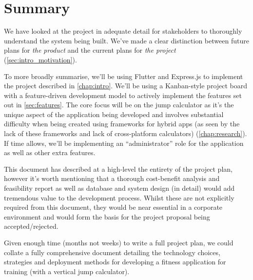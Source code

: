 \chapter{Summary}
We have looked at the project in adequate detail for stakeholders
to thoroughly understand the system being built. We've made a clear distinction between
future plans for \textit{the product} and the current plans for \textit{the project} (\cref{sec:intro_motivation}).
\par
To more broadly summarise, we'll be using Flutter and Express.js to 
implement the project described in \cref{chap:intro}. We'll
be using a Kanban-style project board with a feature-driven development model
to actively implement the features set out in \cref{sec:features}. The core focus
will be on the jump calculator as it's the unique aspect of the application being developed
and involves substantial difficulty when being created using frameworks for hybrid apps (as seen
by the lack of these frameworks and lack of cross-platform calculators) (\cref{chap:research}).
If time allows, we'll be implementing an ``administrator'' role for the application
as well as other extra features.
\par
This document has described at a high-level the entirety of the project plan,
however it's worth mentioning that a thorough cost-benefit analysis
and feasibility report as well as database and system design (in detail)
would add tremendous value to the development process. Whilst these are not 
explicitly required from this document, they would be near essential in a corporate environment
and would form the basis for the project proposal being accepted/rejected.
\par 
Given enough time (months not weeks) to write a full project plan, we could collate a
fully comprehensive document detailing the technology choices, strategies and deployment methods
for developing a fitness application for training (with a vertical jump calculator).